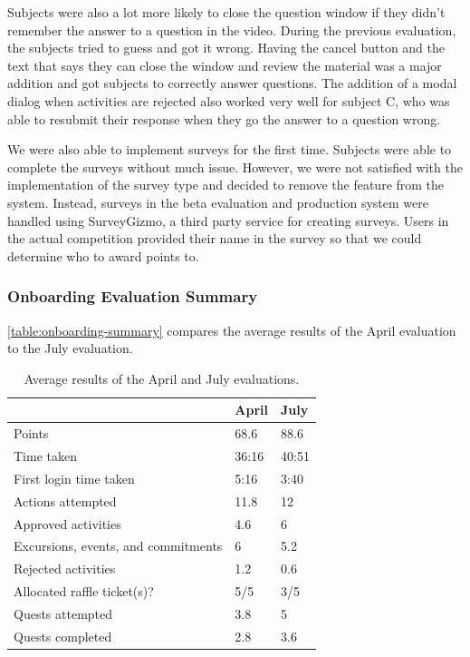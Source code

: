 Subjects were also a lot more likely to close the question window if they didn't remember the answer to a question in the video. During the previous evaluation, the subjects tried to guess and got it wrong. Having the cancel button and the text that says they can close the window and review the material was a major addition and got subjects to correctly answer questions. The addition of a modal dialog when activities are rejected also worked very well for subject C, who was able to resubmit their response when they go the answer to a question wrong.

We were also able to implement surveys for the first time. Subjects were able to complete the surveys without much issue. However, we were not satisfied with the implementation of the survey type and decided to remove the feature from the system. Instead, surveys in the beta evaluation and production system were handled using SurveyGizmo, a third party service for creating surveys. Users in the actual competition provided their name in the survey so that we could determine who to award points to.

\subsubsection{Onboarding Evaluation Summary}

\autoref{table:onboarding-summary} compares the average results of the April evaluation to the July evaluation.

\begin{table}[t]
	\begin{tabular}{| l || l | l |}
		\hline
		& April & July \\
		\hline
		Points & 68.6 & 88.6 \\
		Time taken & 36:16 & 40:51 \\
    First login time taken & 5:16 & 3:40 \\
    Actions attempted & 11.8 & 12 \\
    Approved activities & 4.6 & 6 \\
    Excursions, events, and commitments & 6 & 5.2 \\
    Rejected activities & 1.2 & 0.6 \\
    Allocated raffle ticket(s)? & 5/5 & 3/5 \\
    Quests attempted & 3.8 & 5 \\
    Quests completed & 2.8 & 3.6 \\
		\hline
	\end{tabular}
	\caption{Average results of the April and July evaluations.}
	\label{table:onboarding-summary}
\end{table}

